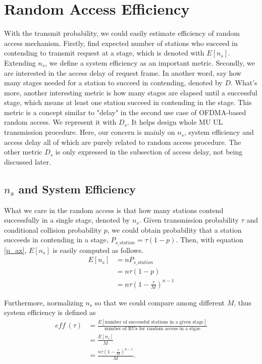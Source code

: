 \section{Random Access Efficiency} \label{sec_metric}
With the transmit probability, we could easily estimate efficiency of random access mechanism. 
Firstly, find expected number of stations who succeed in contending to transmit request at a stage, which is denoted with $E[n_s]$. 
Extending $n_s$, we define a system efficiency as an important metric.
Secondly, we are interested in the access delay of request frame. 
In another word, say how many stages needed for a station to succeed in contending, denoted by $D$.
What's more, another interesting metric is how many stages are elapsed until a successful stage, which means at least one station succeed in contending in the stage. This metric is a concept similar to "delay" in the second use case of OFDMA-based random access. We represent it with $D_s$. It helps design whole MU UL transmission procedure. 
Here, our concern is mainly on $n_s$, system efficiency and access delay all of which are purely related to random access procedure. The other metric $D_s$ is only expressed in the subsection of access delay, not being discussed later. 

\subsection{$n_s$ and System Efficiency}
What we care in the random access is that how many stations contend successfully in a single stage, denoted by $n_s$.
Given transmission probability $\tau$ and conditional collision probability $p$, we could obtain probability that a station succeeds in contending in a stage, $P_{s\_station} = \tau (1-p)$.
Then, with equation \ref{p_ax}, $E[n_s]$ is easily computed as follows. 
\begin{align}
\label{equ_ns}
E[n_s] &= n P_{s\_station} \nonumber \\
		&= n\tau (1-p) \nonumber \\
		&= n\tau (1-\frac{\tau}{M})^{n-1}
\end{align}

Furthermore, normalizing $n_s$ so that we could compare among different $M$, thus system efficiency is defined as 
\begin{align}
\label{eff_def}
\textit{eff}\ (\tau) &= \frac{E[\text{number of successful stations in a given stage}]}{\text{number of RUs for random access in a stgae}} \nonumber\\
					 &=\frac{E[n_s]}{M} \nonumber \\
					 &= \frac{n\tau(1-\frac{\tau}{M})^{n-1}}{M}.
\end{align}

